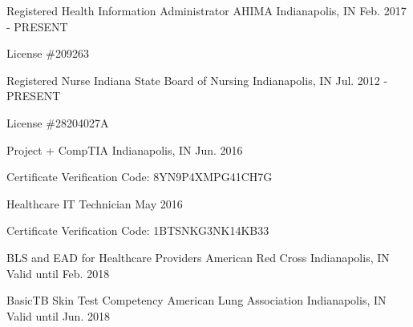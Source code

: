 

\begin{cventries}

  \cventry
    {Registered Health Information Administrator} %
    {AHIMA} %
    {Indianapolis, IN} %
    {Feb. 2017 - PRESENT} %
    {
      \begin{cvitems} %
        \item {License \#209263}
      \end{cvitems}
    }

  \cventry
    {Registered Nurse} %
    {Indiana State Board of Nursing} %
    {Indianapolis, IN} %
    {Jul. 2012 - PRESENT} %
    {
      \begin{cvitems} %
      \item {License \#28204027A}
      \end{cvitems}
    }

  \cventry
    {Project +} %
    {CompTIA} %
    {Indianapolis, IN} %
    {Jun. 2016} %
    {
      \begin{cvitems} %
      \item {Certificate Verification Code: 8YN9P4XMPG41CH7G}
      \end{cvitems}
    }

  \cventry
    {Healthcare IT Technician} %
    {} %
    {} %
    {May 2016} %
    {
      \begin{cvitems} %
      \item {Certificate Verification Code: 1BTSNKG3NK14KB33}
      \end{cvitems}
    }

  \cventry
    {BLS and EAD for Healthcare Providers} %
    {American Red Cross} %
    {Indianapolis, IN} %
    {Valid until Feb. 2018} %
    {
    }
    \vspace{-\baselineskip}

  \cventry
    {BasicTB Skin Test Competency} %
    {American Lung Association} %
    {Indianapolis, IN} %
    {Valid until Jun. 2018} %
    {
    }
    \vspace{-\baselineskip}
\end{cventries}
